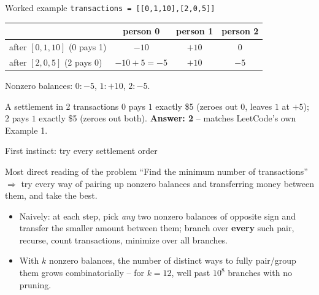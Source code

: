 \documentclass[11pt,aspectratio=169]{beamer}
\begin{document}
\begin{frame}{Worked example}
  \small
  \texttt{transactions = [[0,1,10],[2,0,5]]}
  \begin{center}
  \begin{tabular}{@{}lccc@{}}
    \toprule
    & person 0 & person 1 & person 2 \\
    \midrule
    after $[0,1,10]$ (0 pays 1) & $-10$ & $+10$ & $0$ \\
    after $[2,0,5]$ (2 pays 0) & $-10+5=-5$ & $+10$ & $-5$ \\
    \bottomrule
  \end{tabular}
  \end{center}
  Nonzero balances: $0:-5$, $1:+10$, $2:-5$.
  \begin{exampleblock}{A settlement in 2 transactions}
    $0$ pays $1$ exactly \$5 (zeroes out $0$, leaves $1$ at $+5$); $2$ pays $1$ exactly
    \$5 (zeroes out both). \textbf{Answer: 2} -- matches LeetCode's own Example 1.
  \end{exampleblock}
\end{frame}

\begin{frame}{First instinct: try every settlement order}
  \begin{block}{Most direct reading of the problem}
    ``Find the minimum number of transactions'' $\Rightarrow$ try every way of pairing
    up nonzero balances and transferring money between them, and take the best.
  \end{block}
  \begin{itemize}
    \item Naively: at each step, pick \emph{any} two nonzero balances of opposite sign
    and transfer the smaller amount between them; branch over \textbf{every} such pair,
    recurse, count transactions, minimize over all branches.
    \item With $k$ nonzero balances, the number of distinct ways to fully pair/group
    them grows combinatorially -- for $k=12$, well past $10^8$ branches with no
    pruning.
  \end{itemize}
\end{frame}
\end{document}
